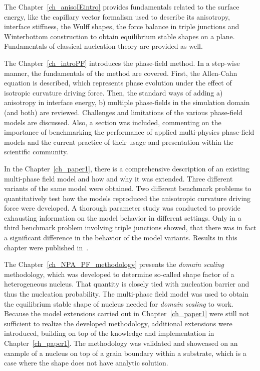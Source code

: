 
The Chapter~\ref{ch_anisoIEintro} provides fundamentals related to the surface energy, like the capillary vector formalism used to describe its anisotropy, interface stiffness, the Wulff shapes, the force balance in triple junctions and Winterbottom construction to obtain equilibrium stable shapes on a plane. Fundamentals of classical nucleation theory are provided as well.

The Chapter~\ref{ch_introPF} introduces the phase-field method. In a step-wise manner, the fundamentals of the method are covered. First, the Allen-Cahn equation is described, which represents phase evolution under the effect of isotropic curvature driving force. Then, the standard ways of adding a) anisotropy in interface energy, b) multiple phase-fields in the simulation domain (and both) are reviewed. Challenges and limitations of the various phase-field models are discussed. Also, a section was included, commenting on the importance of benchmarking the performance of applied multi-physics phase-field models and the current practice of their usage and presentation within the scientific community.

In the Chapter~\ref{ch_paper1}, there is a comprehensive description of an existing multi-phase field model and how and why it was extended. Three different variants of the same model were obtained. Two different benchmark problems to quantitatively test how the models reproduced the anisotropic curvature driving force were developed. A thorough parameter study was conducted to provide exhausting information on the model behavior in different settings. Only in a third benchmark problem involving triple junctions showed, that there was in fact a significant difference in the behavior of the model variants. Results in this chapter were published in~\cite{Minar2022}.

The Chapter~\ref{ch_NPA_PF_methodology} presents the \textit{domain scaling} methodology, which was developed to determine so-called shape factor of a heterogeneous nucleus. That quantity is closely tied with nucleation barrier and thus the nucleation probability. The multi-phase field model was used to obtain the equilibrium stable shape of nucleus needed for \textit{domain scaling} to work. Because the model extensions carried out in Chapter~\ref{ch_paper1} were still not sufficient to realize the developed methodology, additional extensions were introduced, building on top of the knowledge and implementation in Chapter~\ref{ch_paper1}. The methodology was validated and showcased on an example of a nucleus on top of a grain boundary within a substrate, which is a case where the shape does not have analytic solution.

